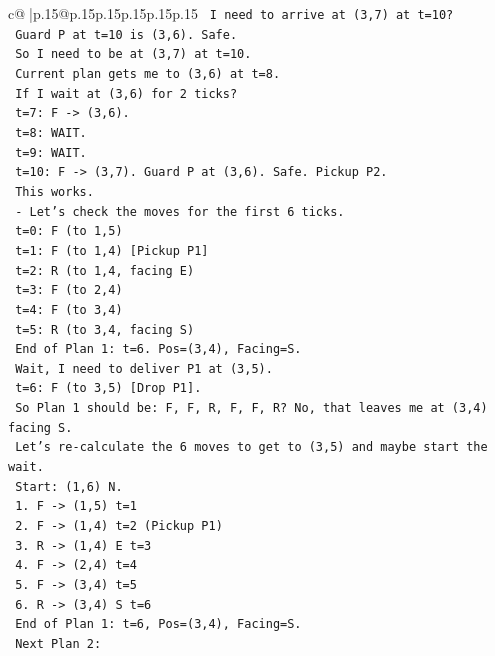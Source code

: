 \documentclass{article}
\begin{document}
{\begin{supertabular}{c@{$\;$}|p{.15\linewidth}@{}p{.15\linewidth}p{.15\linewidth}p{.15\linewidth}p{.15\linewidth}p{.15\linewidth}}
{{{\texttt{    I need to arrive at (3,7) at t=10?} \\
\texttt{    Guard P at t=10 is (3,6). Safe.} \\
\texttt{    So I need to be at (3,7) at t=10.} \\
\texttt{    Current plan gets me to (3,6) at t=8.} \\
\texttt{    If I wait at (3,6) for 2 ticks?} \\
\texttt{    t=7: F {-}> (3,6).} \\
\texttt{    t=8: WAIT.} \\
\texttt{    t=9: WAIT.} \\
\texttt{    t=10: F {-}> (3,7). Guard P at (3,6). Safe. Pickup P2.} \\
\texttt{    This works.} \\
\texttt{  {-} Let's check the moves for the first 6 ticks.} \\
\texttt{    t=0: F (to 1,5)} \\
\texttt{    t=1: F (to 1,4) {[}Pickup P1{]}} \\
\texttt{    t=2: R (to 1,4, facing E)} \\
\texttt{    t=3: F (to 2,4)} \\
\texttt{    t=4: F (to 3,4)} \\
\texttt{    t=5: R (to 3,4, facing S)} \\
\texttt{    End of Plan 1: t=6. Pos=(3,4), Facing=S.} \\
\texttt{    Wait, I need to deliver P1 at (3,5).} \\
\texttt{    t=6: F (to 3,5) {[}Drop P1{]}.} \\
\texttt{    So Plan 1 should be: F, F, R, F, F, R? No, that leaves me at (3,4) facing S.} \\
\texttt{    Let's re{-}calculate the 6 moves to get to (3,5) and maybe start the wait.} \\
\texttt{    Start: (1,6) N.} \\
\texttt{    1. F {-}> (1,5) t=1} \\
\texttt{    2. F {-}> (1,4) t=2 (Pickup P1)} \\
\texttt{    3. R {-}> (1,4) E t=3} \\
\texttt{    4. F {-}> (2,4) t=4} \\
\texttt{    5. F {-}> (3,4) t=5} \\
\texttt{    6. R {-}> (3,4) S t=6} \\
\texttt{    End of Plan 1: t=6, Pos=(3,4), Facing=S.} \\
\texttt{    Next Plan 2:} \\
}}}
\end{supertabular}}
\end{document}

